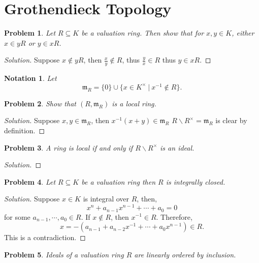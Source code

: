 \documentclass[8pt]{article}
\numberwithin{equation}{section}
\newenvironment{solution}{\begin{proof}[Solution]}{\end{proof}}
\newtheorem{notation}{Notation}[section]
\newtheorem{problem}{Problem}[section]
\newcommand{\m}[0]{\mathfrak{m}}
\newcommand{\sep}[0]{\:|\:}
\begin{document}
\section{Grothendieck Topology}
\begin{problem}
  Let $R\subseteq K$ be a valuation ring. Then show that for $x,y\in K$, either $x\in yR$ or $y\in xR$.
\end{problem}
\begin{solution}
  Suppose $x\not\in yR$, then ${\frac x y}\not\in R$, thus ${\frac y x}\in R$ thus $y\in xR$.
\end{solution}
\begin{notation}
Let 
\begin{equation*}
  \m_R = \{0\}\cup\{x\in K^\times\sep x^{-1}\not\in R\}.
\end{equation*}
\end{notation}
\begin{problem}
  Show that $(R,\m_R)$ is a local ring.
\end{problem}
\begin{solution}
  Suppose $x,y\in\m_R$, then $x^{-1}(x+y)\in\m_R$ $R\backslash R^\times = \m_R$ is clear by definition.

\end{solution}
\begin{problem}
  A ring is local if and only if $R\backslash R^\times$ is an ideal.
\end{problem}
\begin{solution}
  
\end{solution}
\begin{problem}
  Let $R\subseteq K$ be a valuation ring then $R$ is integrally closed.
\end{problem}
\begin{solution}
  Suppose $x\in K$ is integral over $R$, then,
  \begin{equation*}
    x^n+a_{n-1}x^{n-1}+\cdots+a_0=0
  \end{equation*}
  for some $a_{n-1},\cdots,a_0\in R$. If $x\not\in R$, then $x^{-1}\in R$. Therefore,
  \begin{equation*}
    x = -(a_{n-1}+a_{n-2}x^{-1}+\cdots+a_0x^{n-1})\in R.
  \end{equation*}
  This is a contradiction.
\end{solution}
\begin{problem}
  Ideals of a valuation ring $R$ are linearly ordered by inclusion.
\end{problem}
\end{document}
